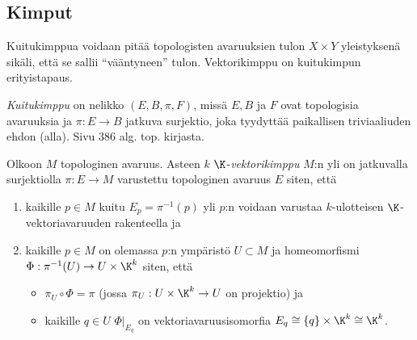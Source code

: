 \subsection{Kimput}
Kuitukimppua voidaan pitää topologisten avaruuksien tulon $X\times Y$ yleistyksenä sikäli, että se sallii ``vääntyneen'' tulon. Vektorikimppu on kuitukimpun erityistapaus.
\begin{maaritelma}[Kuitukimppu]
    \emph{Kuitukimppu} on nelikko $(E,B,\pi,F)$, missä $E,B$ ja $F$ ovat topologisia avaruuksia ja $\pi:E\to B$ jatkuva surjektio, joka tyydyttää paikallisen triviaaliuden ehdon (alla). Sivu 386 alg. top. kirjasta.
\end{maaritelma}
\begin{maaritelma}[Vektorikimppu]
    Olkoon $M$ topologinen avaruus. Asteen $k$ $\K$-\emph{vektorikimppu} $M$:n yli on jatkuvalla surjektiolla $\pi:E\to M$ varustettu topologinen avaruus $E$ siten, että 
    \begin{enumerate}
        \item kaikille $p\in M$ kuitu $E_p=\pi^{-1}(p)$ yli $p$:n voidaan varustaa $k$-ulotteisen $\K$-vektoriavaruuden rakenteella ja
        \item kaikille $p\in M$ on olemassa $p$:n ympäristö $U\subset M$ ja homeomorfismi $\Phi:\pi^{-1}(U)\to U\times\K^k$ siten, että
        \begin{itemize}
            \item $\pi_U\circ\Phi=\pi$ (jossa $\pi_U:U\times\K^k\to U$ on projektio) ja
            \item kaikille $q\in U$ $\Phi|_{E_q}$ on vektoriavaruusisomorfia $E_q\cong\{q\}\times\K^k\cong\K^k$.
        \end{itemize}
    \end{enumerate}
\end{maaritelma}


